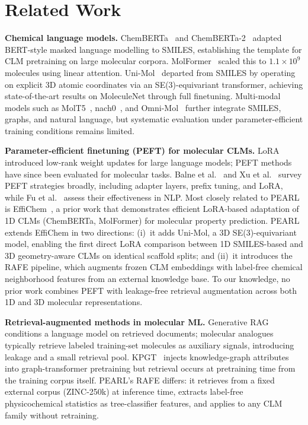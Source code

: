 \documentclass[9pt,twocolumn,conference]{IEEEtran}
\begin{document}
\section{Related Work}

\textbf{Chemical language models.}
ChemBERTa~\cite{chithrananda2020chemberta} and ChemBERTa-2~\cite{ahmad2022chemberta2} adapted BERT-style masked language modelling to SMILES, establishing the template for CLM pretraining on large molecular corpora.
MolFormer~\cite{ross2022molformer} scaled this to $1.1\times10^9$ molecules using linear attention.
Uni-Mol~\cite{zhou2023unimol} departed from SMILES by operating on explicit 3D atomic coordinates via an SE(3)-equivariant transformer, achieving state-of-the-art results on MoleculeNet through full finetuning.
Multi-modal models such as MolT5~\cite{edwards2022molt5}, nach0~\cite{livne2024nach0}, and Omni-Mol~\cite{hu2025omnimol} further integrate SMILES, graphs, and natural language, but systematic evaluation under parameter-efficient training conditions remains limited.

\textbf{Parameter-efficient finetuning (PEFT) for molecular CLMs.}
LoRA~\cite{hu2021lora} introduced low-rank weight updates for large language models; PEFT methods have since been evaluated for molecular tasks.
Balne et al.~\cite{balne2024peft} and Xu et al.~\cite{xu2023peftreview} survey PEFT strategies broadly, including adapter layers, prefix tuning, and LoRA, while
Fu et al.~\cite{fu2023effectiveness} assess their effectiveness in NLP.
Most closely related to PEARL is EffiChem~\cite{harod2025effichem}, a prior work that demonstrates efficient LoRA-based adaptation of 1D CLMs (ChemBERTa, MolFormer) for molecular property prediction.
PEARL extends EffiChem in two directions: (i)~it adds Uni-Mol, a 3D SE(3)-equivariant model, enabling the first direct LoRA comparison between 1D SMILES-based and 3D geometry-aware CLMs on identical scaffold splits; and (ii)~it introduces the RAFE pipeline, which augments frozen CLM embeddings with label-free chemical neighborhood features from an external knowledge base.
To our knowledge, no prior work combines PEFT with leakage-free retrieval augmentation across both 1D and 3D molecular representations.

\textbf{Retrieval-augmented methods in molecular ML.}
Generative RAG~\cite{lewis2020rag} conditions a language model on retrieved documents; molecular analogues typically retrieve labeled training-set molecules as auxiliary signals, introducing leakage and a small retrieval pool.
KPGT~\cite{liu2022kpgt} injects knowledge-graph attributes into graph-transformer pretraining but retrieval occurs at pretraining time from the training corpus itself.
PEARL's RAFE differs: it retrieves from a fixed external corpus (ZINC-250k) at inference time, extracts label-free physicochemical statistics as tree-classifier features, and applies to any CLM family without retraining.
\end{document}
